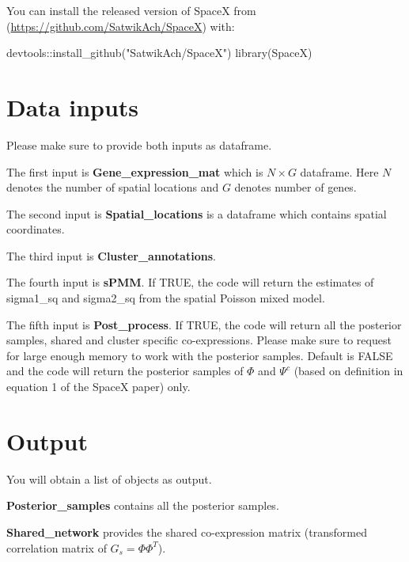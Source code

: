 \documentclass[
]{book}
\newenvironment{Shaded}{\begin{snugshade}}{\end{snugshade}}
\newcommand{\FunctionTok}[1]{\textcolor[rgb]{0.00,0.00,0.00}{#1}}
\newcommand{\NormalTok}[1]{#1}
\newcommand{\SpecialCharTok}[1]{\textcolor[rgb]{0.00,0.00,0.00}{#1}}
\newcommand{\StringTok}[1]{\textcolor[rgb]{0.31,0.60,0.02}{#1}}
\begin{document}
You can install the released version of SpaceX from (\url{https://github.com/SatwikAch/SpaceX}) with:

\begin{Shaded}
\begin{Highlighting}[]
\NormalTok{devtools}\SpecialCharTok{::}\FunctionTok{install\_github}\NormalTok{(}\StringTok{"SatwikAch/SpaceX"}\NormalTok{)}
\FunctionTok{library}\NormalTok{(SpaceX)}
\end{Highlighting}
\end{Shaded}

\hypertarget{data-inputs}{%
\section{Data inputs}\label{data-inputs}}

Please make sure to provide both inputs as dataframe.

The first input is \textbf{Gene\_expression\_mat} which is \(N \times G\) dataframe. Here \(N\) denotes the number of spatial locations and \(G\) denotes number of genes.

The second input is \textbf{Spatial\_locations} is a dataframe which contains spatial coordinates.

The third input is \textbf{Cluster\_annotations}.

The fourth input is \textbf{sPMM}. If TRUE, the code will return the estimates of sigma1\_sq and sigma2\_sq from the spatial Poisson mixed model.

The fifth input is \textbf{Post\_process}. If TRUE, the code will return all the posterior samples, shared and cluster specific co-expressions. Please make sure to request for large enough memory to work with the posterior samples. Default is FALSE and the code will return the posterior samples of \(\Phi\) and \(\Psi^c\) (based on definition in equation 1 of the SpaceX paper) only.

\hypertarget{output}{%
\section{Output}\label{output}}

You will obtain a list of objects as output.

\textbf{Posterior\_samples} contains all the posterior samples.

\textbf{Shared\_network} provides the shared co-expression matrix (transformed correlation matrix of \(G_{s} = \Phi \Phi^{T}\)).
\end{document}
